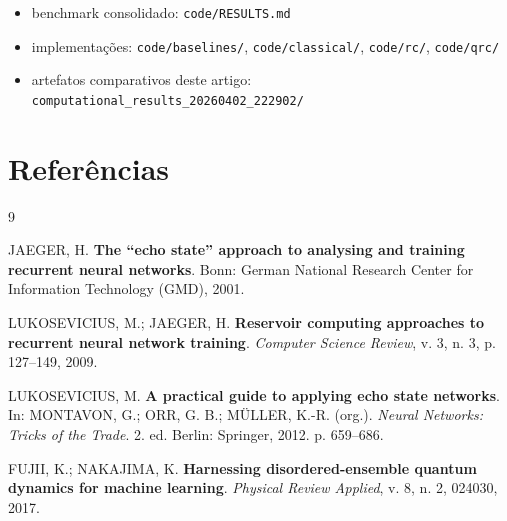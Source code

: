 \documentclass[12pt]{article}
\providecommand{\tightlist}{%
              \setlength{\itemsep}{0pt}\setlength{\parskip}{0pt}}
\begin{document}
\begin{itemize}
\tightlist
\item
  benchmark consolidado: \texttt{code/RESULTS.md}
\item
  implementações: \texttt{code/baselines/}, \texttt{code/classical/}, \texttt{code/rc/}, \texttt{code/qrc/}
\item
  artefatos comparativos deste artigo: \texttt{computational\_results\_20260402\_222902/}
\end{itemize}

\section{Referências}\label{referencias}

\begin{thebibliography}{9}

JAEGER, H. \textbf{The ``echo state'' approach to analysing and training recurrent neural networks}. Bonn: German National Research Center for Information Technology (GMD), 2001.

LUKOSEVICIUS, M.; JAEGER, H. \textbf{Reservoir computing approaches to recurrent neural network training}. \emph{Computer Science Review}, v. 3, n. 3, p. 127--149, 2009.

LUKOSEVICIUS, M. \textbf{A practical guide to applying echo state networks}. In: MONTAVON, G.; ORR, G. B.; MÜLLER, K.-R. (org.). \emph{Neural Networks: Tricks of the Trade}. 2. ed. Berlin: Springer, 2012. p. 659--686.

FUJII, K.; NAKAJIMA, K. \textbf{Harnessing disordered-ensemble quantum dynamics for machine learning}. \emph{Physical Review Applied}, v. 8, n. 2, 024030, 2017.

\end{thebibliography}

            
\end{document}
